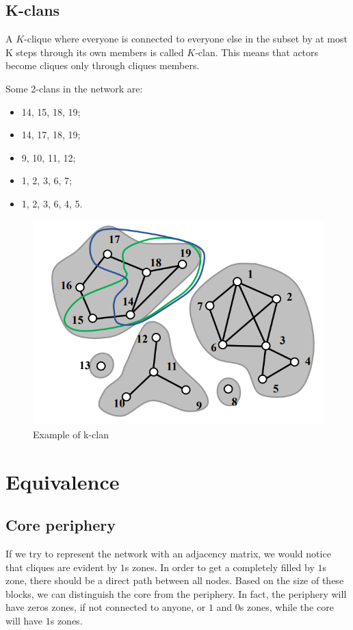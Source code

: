 \documentclass[
  notitlepage,
  onecolumn,
  openany]{book}
\providecommand{\tightlist}{%
  \setlength{\itemsep}{0pt}\setlength{\parskip}{0pt}}
\begin{document}
\hypertarget{k-clans}{%
\subsection{K-clans}\label{k-clans}}

A \(K\)-clique where everyone is connected to everyone else in the subset by at most K steps through its own members is called \(K\)-clan. This means that actors become cliques only through cliques members.

Some 2-clans in the network are:

\begin{itemize}
\tightlist
\item
  14, 15, 18, 19;
\item
  14, 17, 18, 19;
\item
  9, 10, 11, 12;
\item
  1, 2, 3, 6, 7;
\item
  1, 2, 3, 6, 4, 5.
\end{itemize}

\begin{figure}[h!]

{\centering \includegraphics[width=0.5\linewidth]{images/11-Subgroups and Structural Equivalence/Untitled 2} 

}

\caption{Example of k-clan}\label{fig:unnamed-chunk-82}
\end{figure}

\hypertarget{equivalence}{%
\section{Equivalence}\label{equivalence}}

\hypertarget{core-periphery}{%
\subsection{Core periphery}\label{core-periphery}}

If we try to represent the network with an adjacency matrix, we would notice that cliques are evident by \(1\)s zones. In order to get a completely filled by \(1\)s zone, there should be a direct path between all nodes. Based on the size of these blocks, we can distinguish the core from the periphery. In fact, the periphery will have zeros zones, if not connected to anyone, or \(1\) and \(0\)s zones, while the core will have \(1\)s zones.
\end{document}
